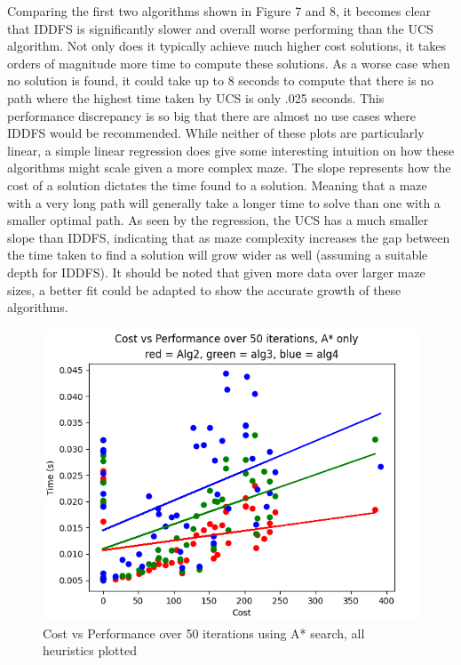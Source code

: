 \documentclass[a4paper]{article}
\begin{document}
Comparing the first two algorithms shown in Figure 7 and 8, it becomes clear that IDDFS is significantly slower and overall worse performing than the UCS algorithm. Not only does it typically achieve much higher cost solutions, it takes orders of magnitude more time to compute these solutions. As a worse case when no solution is found, it could take up to 8 seconds to compute that there is no path where the highest time taken by UCS is only .025 seconds. This performance discrepancy is so big that there are almost no use cases where IDDFS would be recommended. While neither of these plots are particularly linear, a simple linear regression does give some interesting intuition on how these algorithms might scale given a more complex maze. The slope represents how the cost of a solution dictates the time found to a solution. Meaning that a maze with a very long path will generally take a longer time to solve than one with a smaller optimal path. As seen by the regression, the UCS has a much smaller slope than IDDFS, indicating that as maze complexity increases the gap between the time taken to find a solution will grow wider as well (assuming a suitable depth for IDDFS). It should be noted that given more data over larger maze sizes, a better fit could be adapted to show the accurate growth of these algorithms.
\newpage
\begin{figure}[ht]
    \centering
    \includegraphics[width=\textwidth]{AstarCompare.png}
    \caption{ Cost vs Performance over 50 iterations using A* search, all heuristics plotted}
    \label{fig:CostVsPerformanceAstar}
\end{figure}
\end{document}

